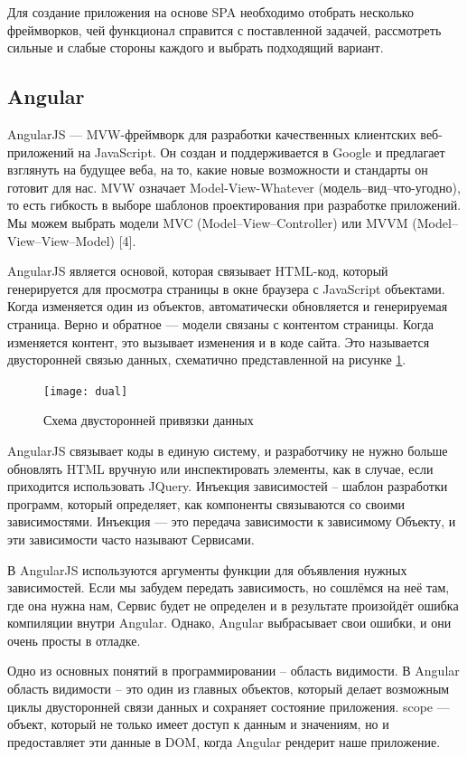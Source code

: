 Для создание приложения на основе SPA необходимо отобрать несколько фреймворков, чей функционал справится с поставленной задачей, рассмотреть сильные и слабые стороны каждого и выбрать подходящий вариант.

\subsection {Angular}

AngularJS --- MVW-фреймворк для разработки качественных клиентских веб-приложений на JavaScript. Он создан и поддерживается в Google и предлагает взглянуть на будущее веба, на то, какие новые возможности и стандарты он готовит для нас. MVW означает Model-View-Whatever (модель--вид--что-угодно), то есть гибкость в выборе шаблонов проектирования при разработке приложений. Мы можем выбрать модели MVC (Model--View--Controller) или MVVM (Model--View--View--Model) [4].

AngularJS является основой, которая связывает HTML-код, который генерируется для просмотра страницы в окне браузера с JavaScript объектами. Когда изменяется один из объектов, автоматически обновляется и генерируемая страница. Верно и обратное --- модели связаны с контентом страницы. Когда изменяется контент, это вызывает изменения и в коде сайта. Это называется двусторонней связью данных, схематично представленной на рисунке \ref{dual}.

\begin{figure}[ht]
\center\texttt{[image: dual]}
\caption{Схема двусторонней привязки данных}\label{dual}
\end{figure}

AngularJS связывает коды в единую систему, и разработчику не нужно больше обновлять HTML вручную или инспектировать элементы, как в случае, если приходится использовать JQuery.
Инъекция зависимостей – шаблон разработки программ, который определяет, как компоненты связываются со своими зависимостями. Инъекция — это передача зависимости к зависимому Объекту, и эти зависимости часто называют Сервисами.

В AngularJS используются аргументы функции для объявления нужных зависимостей. Если мы забудем передать зависимость, но сошлёмся на неё там, где она нужна нам, Сервис будет не определен и в результате произойдёт ошибка компиляции внутри Angular. Однако, Angular выбрасывает свои ошибки, и они очень просты в отладке.

Одно из основных понятий в программировании – область видимости. В Angular область видимости – это один из главных объектов, который делает возможным циклы двусторонней связи данных и сохраняет состояние приложения. \textdollar scope --- объект, который не только имеет доступ к данным и значениям, но и предоставляет эти данные в DOM, когда Angular рендерит наше приложение.

